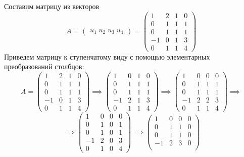 \documentclass[a4paper]{article}
\newcommand{\mat}[1]{\begin{pmatrix} #1 \end{pmatrix}}
\begin{document}
\begin{enumerate}
    Составим матрицу из векторов
    $$A = \mat{u_1 \; u_2 \; u_3 \; u_4}= \begin{pmatrix}
        1 & 2 & 1 & 0 \\
        0 & 1 & 1 & 1 \\
        0 & 1 & 1 & 1 \\
        -1 & 0 & 1 & 3 \\
        0 & 1 & 1 & 4
        \end{pmatrix}
        $$
    Приведем матрицу к ступенчатому виду с помощью элементарных преобразований столбцов:
    $$A= \begin{pmatrix}
        1 & 2 & 1 & 0 \\
        0 & 1 & 1 & 1 \\
        0 & 1 & 1 & 1 \\
        -1 & 0 & 1 & 3 \\
        0 & 1 & 1 & 4
        \end{pmatrix}
        \implies \begin{pmatrix}
            1 & 0 & 1 & 0 \\
            0 & 1 & 1 & 1 \\
            0 & 1 & 1 & 1 \\
            -1 & 2 & 1 & 3 \\
            0 & 1 & 1 & 4
            \end{pmatrix}
            \implies \begin{pmatrix}
                1 & 0 & 0 & 0 \\
                0 & 1 & 1 & 1 \\
                0 & 1 & 1 & 1 \\
                -1 & 2 & 2 & 3 \\
                0 & 1 & 1 & 4
                \end{pmatrix} \implies$$
    $$\implies \begin{pmatrix}
        1 & 0 & 0 & 0 \\
        0 & 1 & 0 & 1 \\
        0 & 1 & 0 & 1 \\
        -1 & 2 & 0 & 3 \\
        0 & 1 & 0 & 4
        \end{pmatrix} \implies \begin{pmatrix}
            1 & 0 & 0 & 0 \\
            0 & 1 & 1 & 0 \\
            0 & 1 & 1 & 0 \\
            -1 & 2 & 3 & 0 \\

\end{pmatrix}$$
\end{enumerate}
\end{document}
